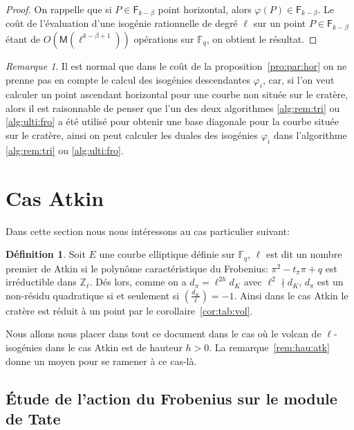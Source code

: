 \documentclass[10pt,a4paper]{book}
\theoremstyle{plain}
\theoremstyle{definition}
\theoremstyle{definition}
\theoremstyle{definition}
\theoremstyle{definition}
\theoremstyle{definition}
\newtheorem{defi}[thm]{Définition}
\theoremstyle{remark}
\newtheorem{rem}[thm]{Remarque}
\theoremstyle{remark}
\theoremstyle{definition}
\begin{document}
\begin{proof}
On rappelle que si $P \in \mathsf{F}_{k-\beta}$ point horizontal, alors 
$\varphi(P) \in \mathsf{F}_{k-\beta}$. Le coût de l'évaluation d'une isogénie 
rationnelle de degré $\ell$ sur un point $P \in \mathsf{F}_{k-\beta}$ étant de 
$O(\mathsf{M}(\ell^{k-\beta+1}))$ opérations sur $\mathbb{F}_q$, on obtient le résultat.
\end{proof}

\begin{rem}
Il est normal que dans le coût de la proposition~\ref{pro:par:hor} on ne prenne
pas en compte le calcul des isogénies descendantes $\varphi_i$, car, si l'on 
veut calculer un point ascendant horizontal pour une courbe non située sur 
le cratère, alors il est raisonnable de penser que l'un des deux algorithmes 
\ref{alg:rem:tri} ou \ref{alg:ulti:fro} a été utilisé pour obtenir une base 
diagonale pour la courbe située sur le cratère, ainsi on peut calculer les 
duales des isogénies $\varphi_i$ dans l'algorithme \ref{alg:rem:tri} ou
\ref{alg:ulti:fro}.
\end{rem}
\section{Cas Atkin}
\label{subs:atk:dir}
Dans cette section nous nous intéressons au cas particulier suivant: 
\begin{defi}
\label{def:cas:atk}
Soit $E$ une courbe elliptique définie sur $\mathbb{F}_q$, $\ell$ est dit un 
nombre premier de Atkin si le polynôme caractéristique du Frobenius: 
$\pi^2-t_{\pi}\pi + q$ est irréductible dans $\mathbb{Z}_{\ell}$. Dés lors, 
comme on a $d_{\pi}=\ell^{2h}d_{K}$ avec $\ell^2 \nmid d_{K}$, 
$d_{\pi}$ est un non-résidu quadratique si et seulement si $\left( 
\frac{d_{K}}{\ell} \right)=-1$. Ainsi dans le cas Atkin le cratère est réduit à
un point par le corollaire~\ref{cor:tab:vol}.
\end{defi}

Nous allons nous placer dans tout ce document dans le cas où le volcan de
$\ell$-isogénies dans le cas Atkin est de hauteur $h>0$. La 
remarque~\ref{rem:hau:atk} donne un moyen pour se ramener à ce cas-là.

\subsection{\'Etude de l'action du Frobenius sur le module de Tate}
\end{document}

